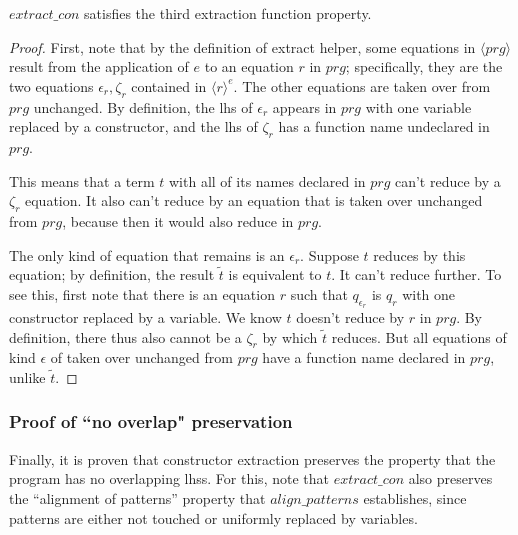 \begin{lemma}

$extract\_con$ satisfies the third extraction function property.

\begin{proof}

First, note that by the definition of extract helper, some equations in $\langle prg \rangle$ result from the application of $e$ to an equation $r$ in $prg$; specifically, they are the two equations $\epsilon_r, \zeta_r$ contained in $\langle r \rangle^e$. The other equations are taken over from $prg$ unchanged. By definition, the lhs of $\epsilon_r$ appears in $prg$ with one variable replaced by a constructor, and the lhs of $\zeta_r$ has a function name undeclared in $prg$.

This means that a term $t$ with all of its names declared in $prg$ can't reduce by a $\zeta_r$ equation. It also can't reduce by an equation that is taken over unchanged from $prg$, because then it would also reduce in $prg$.

The only kind of equation that remains is an $\epsilon_r$. Suppose $t$ reduces by this equation; by definition, the result $\widetilde{t}$ is equivalent to $t$. It can't reduce further. To see this, first note that there is an equation $r$ such that $q_{\epsilon_r}$ is $q_r$ with one constructor replaced by a variable. We know $t$ doesn't reduce by $r$ in $prg$. By definition, there thus also cannot be a $\zeta_r$ by which $\widetilde{t}$ reduces. But all equations of kind $\epsilon$ of taken over unchanged from $prg$ have a function name declared in $prg$, unlike $\widetilde{t}$.

\end{proof}

\end{lemma}

\subsubsection{Proof of ``no overlap" preservation}

Finally, it is proven that constructor extraction preserves the property that the program has no overlapping lhss. For this, note that $extract\_con$ also preserves the ``alignment of patterns'' property that $align\_patterns$ establishes, since patterns are either not touched or uniformly replaced by variables.

